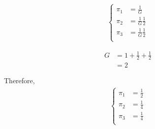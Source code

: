 \documentclass[12pt, a4paper]{article}
\begin{document}
\subsection{}
\begin{subequations}
  \begin{align}
    \begin{cases}
      \pi_{1} &= \frac{1}{G} \\
      \pi_{2} &= \frac{1}{G} \frac{1}{2}\\
      \pi_{3} &= \frac{1}{G} \frac{1}{2}\\
    \end{cases}
  \end{align}
\end{subequations}

\begin{subequations}
  \begin{align}
      G &= 1 + \frac{1}{2} + \frac{1}{2}\\
        &= 2
  \end{align}
\end{subequations}

Therefore, 
\begin{subequations}
  \begin{align}
    \begin{cases}
      \pi_1 &= \frac{1}{2}\\
      \pi_2 &= \frac{1}{4}\\
      \pi_3 &= \frac{1}{4}\\
    \end{cases}
  \end{align}
\end{subequations}

\section{}
\end{document}
